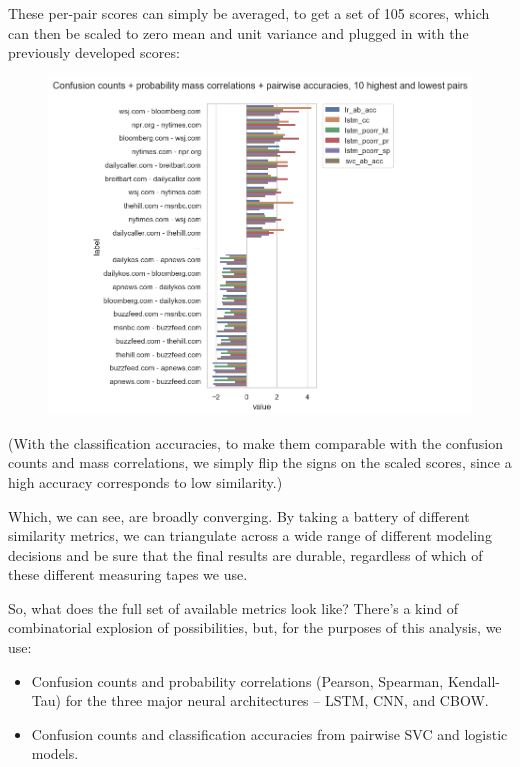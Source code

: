 \documentclass{scrartcl}
\begin{document}
These per-pair scores can simply be averaged, to get a set of 105 scores, which can then be scaled to zero mean and unit variance and plugged in with the previously developed scores:

\begin{figure}[H]
  \centering
  \includegraphics[height=0.4\textheight]{figures/hlg-cc-pcorr-acc-tb10.png}
\end{figure}

(With the classification accuracies, to make them comparable with the confusion counts and mass correlations, we simply flip the signs on the scaled scores, since a high accuracy corresponds to low similarity.)

Which, we can see, are broadly converging. By taking a battery of different similarity metrics, we can triangulate across a wide range of different modeling decisions and be sure that the final results are durable, regardless of which of these different measuring tapes we use.

So, what does the full set of available metrics look like? There's a kind of combinatorial explosion of possibilities, but, for the purposes of this analysis, we use:

\begin{itemize}
\item Confusion counts and probability correlations (Pearson, Spearman, Kendall-Tau) for the three major neural architectures -- LSTM, CNN, and CBOW.
\item Confusion counts and classification accuracies from pairwise SVC and logistic models.
\end{itemize}
\end{document}

